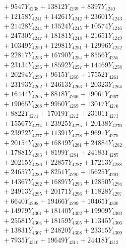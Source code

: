 \documentclass[a4paper,10pt]{article}
\begin{document}
{\begin{align}
&\;  + 9547 Y_{4238} + 13812 Y_{4239} + 8397 Y_{4240} \\[0.3ex]
&\;  + 12158 Y_{4241} + 14261 Y_{4242} + 23601 Y_{4243} \\[0.3ex]
&\;  + 21428 Y_{4244} + 13524 Y_{4245} + 10574 Y_{4246} \\[0.3ex]
&\;  + 24730 Y_{4247} + 18181 Y_{4248} + 21651 Y_{4249} \\[0.3ex]
&\;  + 10349 Y_{4250} + 12981 Y_{4251} + 12996 Y_{4252} \\[0.3ex]
&\;  + 22817 Y_{4253} + 16790 Y_{4254} + 8556 Y_{4255} \\[0.3ex]
&\;  + 23134 Y_{4256} + 18592 Y_{4257} + 14469 Y_{4258} \\[0.5ex]\allowbreak
&\;  + 20294 Y_{4259} + 9615 Y_{4260} + 17552 Y_{4261} \\[0.3ex]
&\;  + 23193 Y_{4262} + 24613 Y_{4263} + 20323 Y_{4264} \\[0.3ex]
&\;  + 16444 Y_{4265} + 8818 Y_{4266} + 19061 Y_{4267} \\[0.3ex]
&\;  + 19065 Y_{4268} + 9950 Y_{4269} + 13017 Y_{4270} \\[0.3ex]
&\;  + 8822 Y_{4271} + 17019 Y_{4272} + 23101 Y_{4273} \\[0.3ex]
&\;  + 15567 Y_{4274} + 23925 Y_{4275} + 20138 Y_{4276} \\[0.3ex]
&\;  + 23922 Y_{4277} + 11391 Y_{4278} + 9691 Y_{4279} \\[0.3ex]
&\;  + 20154 Y_{4280} + 16849 Y_{4281} + 24884 Y_{4282} \\[0.3ex]
&\;  + 17881 Y_{4283} + 8199 Y_{4284} + 24183 Y_{4285} \\[0.3ex]
&\;  + 20215 Y_{4286} + 22857 Y_{4287} + 17213 Y_{4288} \\[0.5ex]\allowbreak
&\;  + 24657 Y_{4289} + 8251 Y_{4290} + 15625 Y_{4291} \\[0.3ex]
&\;  + 14367 Y_{4292} + 16897 Y_{4293} + 12850 Y_{4294} \\[0.3ex]
&\;  + 24913 Y_{4295} + 20171 Y_{4296} + 11828 Y_{4297} \\[0.3ex]
&\;  + 6640 Y_{4298} + 19466 Y_{4299} + 10465 Y_{4300} \\[0.3ex]
&\;  + 14979 Y_{4301} + 18140 Y_{4302} + 19909 Y_{4303} \\[0.3ex]
&\;  + 25581 Y_{4304} + 18159 Y_{4305} + 11345 Y_{4306} \\[0.3ex]
&\;  + 13831 Y_{4307} + 24820 Y_{4308} + 23315 Y_{4309} \\[0.3ex]
&\;  + 7935 Y_{4310} + 19649 Y_{4311} + 24418 Y_{4312} \\[0.3ex]

\end{align}}
\end{document}
